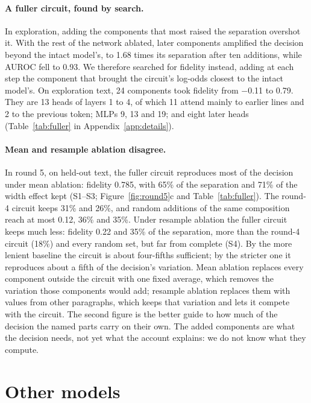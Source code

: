 \documentclass[11pt,a4paper]{article}
\begin{document}
\paragraph{A fuller circuit, found by search.}
In exploration, adding the components that most raised the separation overshot it. With the rest of the network ablated, later components amplified the decision beyond the intact model's, to 1.68 times its separation after ten additions, while AUROC fell to 0.93. We therefore searched for fidelity instead, adding at each step the component that brought the circuit's log-odds closest to the intact model's. On exploration text, 24 components took fidelity from $-$0.11 to 0.79. They are 13 heads of layers 1 to 4, of which 11 attend mainly to earlier lines and 2 to the previous token; MLPs 9, 13 and 19; and eight later heads (Table~\ref{tab:fuller} in Appendix~\ref{app:details}).

\paragraph{Mean and resample ablation disagree.}
In round 5, on held-out text, the fuller circuit reproduces most of the decision under mean ablation: fidelity 0.785, with 65\% of the separation and 71\% of the width effect kept (S1--S3; Figure~\ref{fig:round5}c and Table~\ref{tab:fuller}). The round-4 circuit keeps 31\% and 26\%, and random additions of the same composition reach at most 0.12, 36\% and 35\%. Under resample ablation the fuller circuit keeps much less: fidelity 0.22 and 35\% of the separation, more than the round-4 circuit (18\%) and every random set, but far from complete (S4). By the more lenient baseline the circuit is about four-fifths sufficient; by the stricter one it reproduces about a fifth of the decision's variation. Mean ablation replaces every component outside the circuit with one fixed average, which removes the variation those components would add; resample ablation replaces them with values from other paragraphs, which keeps that variation and lets it compete with the circuit. The second figure is the better guide to how much of the decision the named parts carry on their own. The added components are what the decision needs, not yet what the account explains: we do not know what they compute.

\FloatBarrier
\section{Other models}
\label{sec:models}
\end{document}
